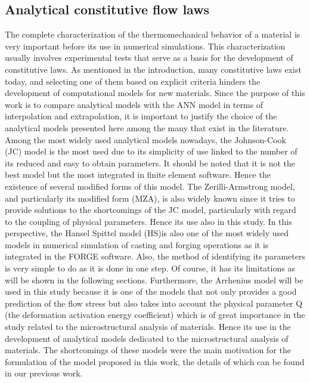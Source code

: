 \documentclass[twoside,english,1p,final,sort&compress]{elsarticle}
\theoremstyle{plain}
\begin{document}
\subsection{Analytical constitutive flow laws}
The complete characterization of the thermomechanical behavior of a material is very important before its use in numerical simulations. This characterization usually involves experimental tests that serve as a basis for the development of constitutive laws. As mentioned in the introduction, many constitutive laws exist today, and selecting one of them based on explicit criteria hinders the development of computational models for new materials. Since the purpose of this work is to compare analytical models with the ANN model in terms of interpolation and extrapolation, it is important to justify the choice of the analytical models presented here among the many that exist in the literature. Among the most widely used analytical models nowadays, the Johnson-Cook (JC) model is the most used due to its simplicity of use linked to the number of its reduced and easy to obtain parameters. It should be noted that it is not the best model but the most integrated in finite element software. Hence the existence of several modified forms of this model. The Zerilli-Armstrong model, and particularly its modified form (MZA), is also widely known since it tries to provide solutions to the shortcomings of the JC model, particularly with regard to the coupling of physical parameters. Hence its use also in this study. In this perspective, the Hansel Spittel model (HS)is also one of the most widely used models in numerical simulation of casting and forging operations as it is integrated in the FORGE software. Also, the method of identifying its parameters is very simple to do as it is done in one step. Of course, it has its limitations as will be shown in the following sections. Furthermore, the Arrhenius model will be used in this study because it is one of the models that not only provides a good prediction of the flow stress but also takes into account the physical parameter Q (the deformation activation energy coefficient) which is of great importance in the study related to the microstructural analysis of materials. Hence its use in the development of analytical models dedicated to the microstructural analysis of materials. The shortcomings of these models were the main motivation for the formulation of the model proposed in this work, the details of which can be found in our previous work.
\end{document}
